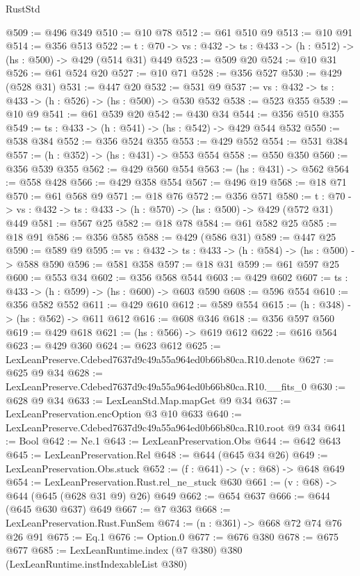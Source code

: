 \begin{lexlean}{RustStd}
\begin{coremodule}
@509 := @496 @349
@510 := @10 @78
@512 := @61 @510 @9
@513 := @10 @91
@514 := @356 @513
@522 := {t : @70} -> {vs : @432} -> {ts : @433} -> (h : @512) -> (hs : @500) -> @429 (@514 @31) @449
@523 := @509 @20
@524 := @10 @31
@526 := @61 @524 @20
@527 := @10 @71
@528 := @356 @527
@530 := @429 (@528 @31)
@531 := @447 @20
@532 := @531 @9
@537 := {vs : @432} -> {ts : @433} -> (h : @526) -> (hs : @500) -> @530 @532
@538 := @523 @355
@539 := @10 @9
@541 := @61 @539 @20
@542 := @430 @34
@544 := @356 @510 @355
@549 := {ts : @433} -> (h : @541) -> (hs : @542) -> @429 @544 @532
@550 := @538 @384
@552 := @356 @524 @355
@553 := @429 @552
@554 := @531 @384
@557 := (h : @352) -> (hs : @431) -> @553 @554
@558 := @550 @350
@560 := @356 @539 @355
@562 := @429 @560 @554
@563 := (hs : @431) -> @562
@564 := @558 @428
@566 := @429 @358 @554
@567 := @496 @19
@568 := @18 @71
@570 := @61 @568 @9
@571 := @18 @76
@572 := @356 @571
@580 := {t : @70} -> {vs : @432} -> {ts : @433} -> (h : @570) -> (hs : @500) -> @429 (@572 @31) @449
@581 := @567 @25
@582 := @18 @78
@584 := @61 @582 @25
@585 := @18 @91
@586 := @356 @585
@588 := @429 (@586 @31)
@589 := @447 @25
@590 := @589 @9
@595 := {vs : @432} -> {ts : @433} -> (h : @584) -> (hs : @500) -> @588 @590
@596 := @581 @358
@597 := @18 @31
@599 := @61 @597 @25
@600 := @553 @34
@602 := @356 @568 @544
@603 := @429 @602
@607 := {ts : @433} -> (h : @599) -> (hs : @600) -> @603 @590
@608 := @596 @554
@610 := @356 @582 @552
@611 := @429 @610
@612 := @589 @554
@615 := (h : @348) -> (hs : @562) -> @611 @612
@616 := @608 @346
@618 := @356 @597 @560
@619 := @429 @618
@621 := (hs : @566) -> @619 @612
@622 := @616 @564
@623 := @429 @360
@624 := @623 @612
@625 := LexLeanPreserve.Cdebed7637d9c49a55a964ed0b66b80ca.R10.denote
@627 := @625 @9 @34
@628 := LexLeanPreserve.Cdebed7637d9c49a55a964ed0b66b80ca.R10.__fits_0
@630 := @628 @9 @34
@633 := LexLeanStd.Map.mapGet @9 @34
@637 := LexLeanPreservation.encOption @3 @10 @633
@640 := LexLeanPreserve.Cdebed7637d9c49a55a964ed0b66b80ca.R10.root @9 @34
@641 := Bool
@642 := Ne.{1}
@643 := LexLeanPreservation.Obs
@644 := @642 @643
@645 := LexLeanPreservation.Rel
@648 := @644 (@645 @34 @26)
@649 := LexLeanPreservation.Obs.stuck
@652 := (f : @641) -> (v : @68) -> @648 @649
@654 := LexLeanPreservation.Rust.rel_ne_stuck @630
@661 := (v : @68) -> @644 (@645 (@628 @31 @9) @26) @649
@662 := @654 @637
@666 := @644 (@645 @630 @637) @649
@667 := @7 @363
@668 := LexLeanPreservation.Rust.FunSem
@674 := (n : @361) -> @668 @72 @74 @76 @26 @91
@675 := Eq.{1}
@676 := Option.{0}
@677 := @676 @380
@678 := @675 @677
@685 := LexLeanRuntime.index (@7 @380) @380 (LexLeanRuntime.instIndexableList @380)

\end{coremodule}
\end{lexlean}
